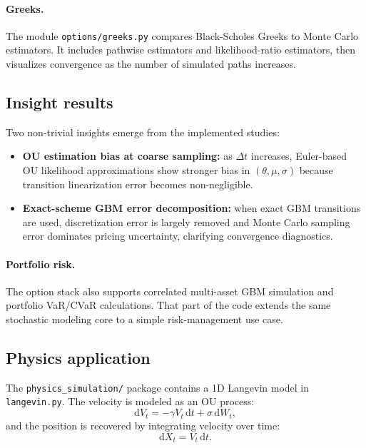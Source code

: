 \documentclass[11pt]{article}
\newcommand{\dd}{\mathrm{d}}
\begin{document}
\paragraph{Greeks.}
The module \texttt{options/greeks.py} compares Black-Scholes Greeks to Monte Carlo estimators. It includes pathwise estimators and likelihood-ratio estimators, then visualizes convergence as the number of simulated paths increases.

\subsection{Insight results}

Two non-trivial insights emerge from the implemented studies:
\begin{itemize}[leftmargin=1.2em]
  \item \textbf{OU estimation bias at coarse sampling:} as $\Delta t$ increases, Euler-based OU likelihood approximations show stronger bias in $(\theta,\mu,\sigma)$ because transition linearization error becomes non-negligible.
  \item \textbf{Exact-scheme GBM error decomposition:} when exact GBM transitions are used, discretization error is largely removed and Monte Carlo sampling error dominates pricing uncertainty, clarifying convergence diagnostics.
\end{itemize}

\paragraph{Portfolio risk.}
The option stack also supports correlated multi-asset GBM simulation and portfolio VaR/CVaR calculations. That part of the code extends the same stochastic modeling core to a simple risk-management use case.

\subsection{Physics application}

The \texttt{physics\_simulation/} package contains a 1D Langevin model in \texttt{langevin.py}. The velocity is modeled as an OU process:
\begin{equation}
  \dd V_t = -\gamma V_t\,\dd t + \sigma\,\dd W_t,
\end{equation}
and the position is recovered by integrating velocity over time:
\begin{equation}
  \dd X_t = V_t\,\dd t.
\end{equation}
\end{document}
